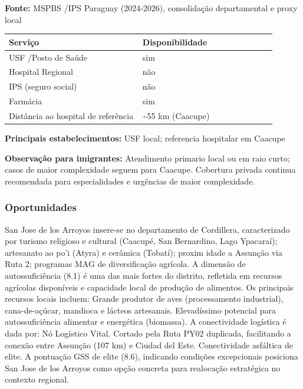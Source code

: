 \textbf{Fonte:} MSPBS /\allowbreak  IPS Paraguay (2024-2026), consolidação
departamental e proxy local

{\def\LTcaptype{none} %
\begin{longtable}{@{}>{\raggedright\arraybackslash}p{0.45\linewidth} >{\raggedright\arraybackslash}p{0.45\linewidth}@{}}
\toprule\noalign{}
Serviço & Disponibilidade \\
\midrule\noalign{}
\endhead
\bottomrule\noalign{}
\endlastfoot
USF /\allowbreak  Posto de Saúde & sim \\
Hospital Regional & não \\
IPS (seguro social) & não \\
Farmácia & sim \\
Distância ao hospital de referência & \textasciitilde55 km (Caacupe) \\
\end{longtable}
}

\textbf{Principais estabelecimentos:} USF local; referencia hospitalar
em Caacupe

\textbf{Observação para imigrantes:} Atendimento primario local ou em
raio curto; casos de maior complexidade seguem para Caacupe. Cobertura
privada continua recomendada para especialidades e urgências de maior
complexidade.
\newpage

\subsubsection*{Oportunidades}\label{oport-san-jose-de-los-arroyos-0317}
San Jose de los Arroyos insere-se no departamento de Cordillera, caracterizado por turismo religioso e cultural (Caacupé, San Bernardino, Lago Ypacaraí); artesanato ao po'i (Atyra) e cerâmica (Tobatí); proxim idade a Assunção via Ruta 2; programas MAG de diversificação agrícola. A dimensão de autossuficiência (8.1) é uma das mais fortes do distrito, refletida em recursos agrícolas disponíveis e capacidade local de produção de alimentos. Os principais recursos locais incluem: Grande produtor de aves (processamento industrial), cana-de-açúcar, mandioca e lácteos artesanais. Elevadíssimo potencial para autossuficiência alimentar e energética (biomassa). A conectividade logística é dada por: Nó Logístico Vital. Cortado pela Ruta PY02 duplicada, facilitando a conexão entre Assunção (107 km) e Ciudad del Este. Conectividade asfáltica de elite. A pontuação GSS de elite (8.6), indicando condições excepcionais posiciona San Jose de los Arroyos como opção concreta para realocação estratégica no contexto regional.

